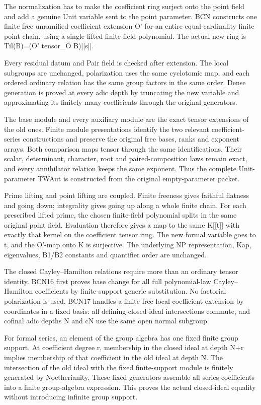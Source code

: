 The normalization has to make the coefficient ring surject onto the point field and add a genuine Unit variable sent to the point parameter. BCN constructs one finite free unramified coefficient extension O' for an entire equal-cardinality finite point chain, using a single lifted finite-field polynomial. The actual new ring is Til(B)=(O' tensor\_\allowbreak{}O B)[[s]].

Every residual datum and Pair field is checked after extension. The local subgroups are unchanged, polarization uses the same cyclotomic map, and each ordered ordinary relation has the same group factors in the same order. Dense generation is proved at every adic depth by truncating the new variable and approximating its finitely many coefficients through the original generators.

The base module and every auxiliary module are the exact tensor extensions of the old ones. Finite module presentations identify the two relevant coefficient-series constructions and preserve the original free bases, ranks and exponent arrays. Both comparison maps tensor through the same identifications. Their scalar, determinant, character, root and paired-composition laws remain exact, and every annihilator relation keeps the same exponent. Thus the complete Unit-parameter TWAut is constructed from the original empty-parameter packet.

Prime lifting and point lifting are coupled. Finite freeness gives faithful flatness and going down; integrality gives going up along a whole finite chain. For each prescribed lifted prime, the chosen finite-field polynomial splits in the same original point field. Evaluation therefore gives a map to the same K[[t]] with exactly that kernel on the coefficient tensor ring. The new formal variable goes to t, and the O'-map onto K is surjective. The underlying NP representation, Kap, eigenvalues, B1/\allowbreak{}B2 constants and quantifier order are unchanged.

The closed Cayley–Hamilton relations require more than an ordinary tensor identity. BCN16 first proves base change for all full polynomial-law Cayley–Hamilton coefficients by finite-support generic substitution. No factorial polarization is used. BCN17 handles a finite free local coefficient extension by coordinates in a fixed basis: all defining closed-ideal intersections commute, and cofinal adic depths N and cN use the same open normal subgroup.

For formal series, an element of the group algebra has one fixed finite group support. At coefficient degree r, membership in the closed ideal at depth N+r implies membership of that coefficient in the old ideal at depth N. The intersection of the old ideal with the fixed finite-support module is finitely generated by Noetherianity. These fixed generators assemble all series coefficients into a finite group-algebra expression. This proves the actual closed-ideal equality without introducing infinite group support.

